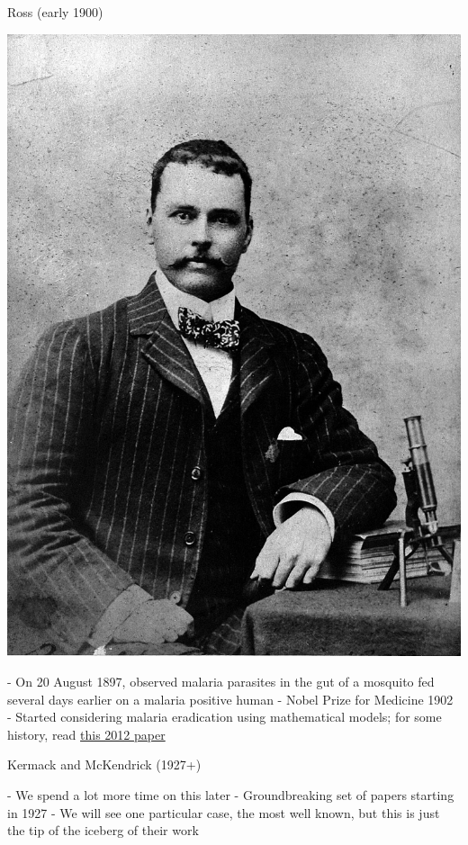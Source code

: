 \documentclass[aspectratio=43]{beamer}
\begin{document}
\begin{frame}{Ross (early 1900)}
\begin{minipage}{0.5\textwidth}
    \includegraphics[width=\textwidth]{../FIGS/RonaldRoss_WellcomeCollection.jpg}
\end{minipage}
\begin{minipage}{0.47\textwidth}
- On 20 August 1897, observed malaria parasites in the gut of a mosquito fed several days earlier on a malaria positive human
\vfill
- Nobel Prize for Medicine 1902
\vfill
- Started considering malaria eradication using mathematical models; for some history, read \href{https://www.ncbi.nlm.nih.gov/pmc/articles/PMC3320609/pdf/ppat.1002588.pdf}{this 2012 paper}
\end{minipage}
\end{frame}


\begin{frame}{Kermack and McKendrick (1927+)}

- We spend a lot more time on this later
\vfill
- Groundbreaking set of papers starting in 1927
\vfill
- We will see one particular case, the most well known, but this is just the tip of the iceberg of their work
\end{frame}
\end{document}
